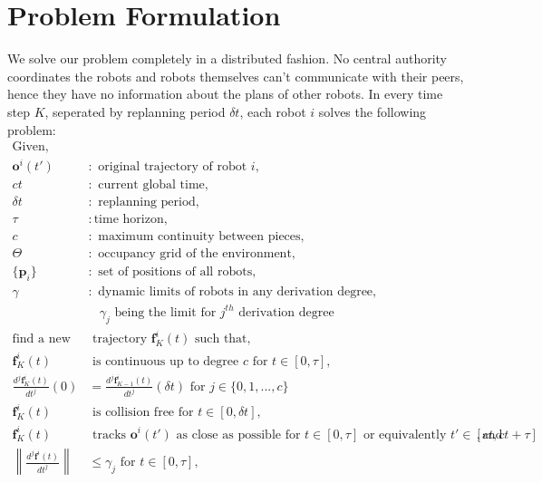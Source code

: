 \documentclass{svproc}
\newcommand{\vp}{\mathbf{p}}
\newcommand{\vf}{\mathbf{f}}
\newcommand{\vo}{\mathbf{o}}
\begin{document}
\section{Problem Formulation}
We solve our problem completely in a distributed fashion. No central authority coordinates the robots and robots themselves can't communicate with their peers, hence they have no information about the plans of other robots. In every time step $K$, seperated by replanning period $\delta t$, each robot $i$ solves the following problem:
\begin{align*}
    \text{Given,}\ \ \ \ \ &\\
    \vo^i(t')&:\text{ original trajectory of robot $i$},\\
    ct&:\text{ current global time},\\
    \delta t&:\text{ replanning period},\\
    \tau&: \text{time horizon},\\ 
    c&:\text{ maximum continuity between pieces},\\
    \Theta&:\text{ occupancy grid of the environment},\\
    \{\vp_i\}&:\text{ set of positions of all robots},\\
    \gamma&: \text{ dynamic limits of robots in any derivation degree},\\
    &\ \ \ \ \gamma_j \text{ being the limit for $j^{th}$ derivation degree}\\
    \text{find a new}&\text{ trajectory $\vf_K^i(t)$ such that},\\
    \vf_K^i(t)&\text{ is}\text{ continuous up to degree $c$ for }t\in [0,\tau],\\
    \frac{d^j\vf_K^i(t)}{dt^j}(0) &= \frac{d^j\vf_{K-1}^i(t)}{dt^j}(\delta t)\text{ for } j\in\{0,1,...,c\}\\
    \vf_K^i(t)&\text{ is collision free for $t\in [0,\delta t]$},\\
    \vf_K^i(t)&\text{ tracks $\vo^i(t')$ as close as possible for $t\in[0,\tau]$ or equivalently $t'\in[ct, ct+\tau]$ }, \text{and}\\
    \left\|\frac{d^j \vf^i(t)}{dt^j}\right\| &\leq \gamma_j\text{ for } t\in [0,\tau],\\
\end{align*}
\end{document}
